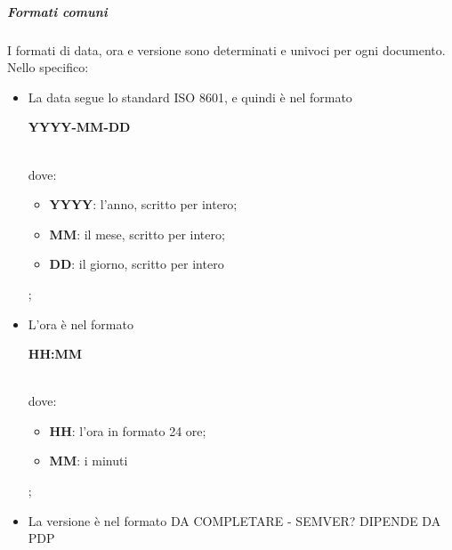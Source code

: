 \documentclass[../norme-di-progetto.tex]{subfiles}
\begin{document}
\subparagraph{Formati comuni}
I formati di data, ora e versione sono determinati e univoci per ogni documento. Nello specifico:
\begin{itemize}
  \item La data segue lo standard ISO 8601, e quindi è nel formato \\ \centerline{\textbf{YYYY-MM-DD}} \\ dove:
  \begin{itemize}
    \item \textbf{YYYY}: l'anno, scritto per intero;
    \item \textbf{MM}: il mese, scritto per intero;
    \item \textbf{DD}: il giorno, scritto per intero
  \end{itemize};
  \item L'ora è nel formato \\ \centerline{\textbf{HH:MM}} \\ dove:
  \begin{itemize}
    \item \textbf{HH}: l'ora in formato 24 ore;
    \item \textbf{MM}: i minuti
  \end{itemize};
  \item La versione è nel formato DA COMPLETARE - SEMVER? DIPENDE DA PDP
\end{itemize}
\end{document}
